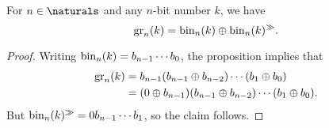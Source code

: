 \documentclass[article, a4paper, 11pt, oneside]{memoir}
\numberwithin{equation}{chapter}
\begin{document}
\begin{corollary}
    For $n \in \naturals$ and any $n$-bit number $k$, we have
    \begin{equation*}
        \gray[n]{k}
            = \bin[n]{k} \xor \bin[n]{k}\shiftr.
    \end{equation*}
\end{corollary}

\begin{proof}
    Writing $\bin[n]{k} = b_{n-1} \cdots b_0$, the proposition implies that
    \begin{align*}
        \gray[n]{k}
            &= b_{n-1} (b_{n-1} \xor b_{n-2}) \cdots (b_1 \xor b_0) \\
            &= (0 \xor b_{n-1}) (b_{n-1} \xor b_{n-2}) \cdots (b_1 \xor b_0).
    \end{align*}
    But $\bin[n]{k}\shiftr = 0 b_{n-1} \cdots b_1$, so the claim follows.
\end{proof}


\nocite{*}

\printbibliography
\end{document}
